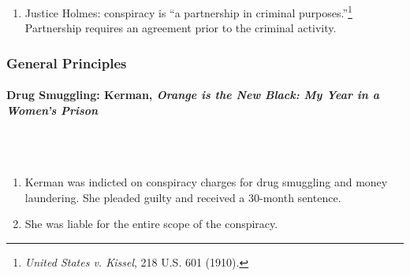 \begin{enumerate}
    \item Justice Holmes: conspiracy is ``a partnership in criminal 
    purposes.''\footnote{\emph{United States v. Kissel}, 218 U.S. 601 (1910).} 
    Partnership requires an agreement prior to the criminal activity.
\end{enumerate}

\subsubsection{General Principles}

\paragraph{Drug Smuggling: Kerman, \emph{Orange is the New Black: My Year in a 
Women's Prison}}
~\\\\
\begin{enumerate}
    \item Kerman was indicted on conspiracy charges for drug smuggling and 
    money laundering. She pleaded guilty and received a 30-month sentence.
    \item She was liable for the entire scope of the conspiracy.
\end{enumerate}

